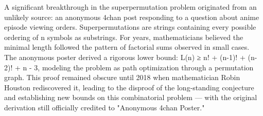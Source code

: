 A significant breakthrough in the superpermutation problem originated from an unlikely source: an anonymous 4chan post responding to a question about anime episode viewing orders. Superpermutations are strings containing every possible ordering of n symbols as substrings. For years, mathematicians believed the minimal length followed the pattern of factorial sums observed in small cases. The anonymous poster derived a rigorous lower bound: L(n) ≥ n! + (n-1)! + (n-2)! + n - 3, modeling the problem as path optimization through a permutation graph. This proof remained obscure until 2018 when mathematician Robin Houston rediscovered it, leading to the disproof of the long-standing conjecture and establishing new bounds on this combinatorial problem — with the original derivation still officially credited to "Anonymous 4chan Poster."
